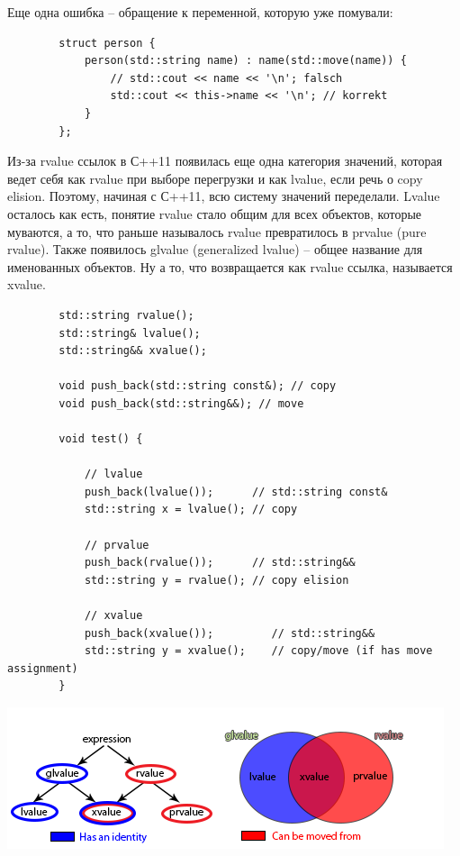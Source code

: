 \documentclass[12pt, a4paper]{article}
\begin{document}
	Еще одна ошибка -- обращение к переменной, которую уже помували:
	\begin{verbatim}
		struct person {
			person(std::string name) : name(std::move(name)) {
				// std::cout << name << '\n'; falsch
				std::cout << this->name << '\n'; // korrekt
			}
		};
	\end{verbatim}
	Из-за rvalue ссылок в С++11 появилась еще одна категория значений, которая ведет себя как rvalue при выборе перегрузки и как lvalue, если речь о copy elision. Поэтому, начиная с С++11, всю систему значений переделали. Lvalue осталось как есть, понятие rvalue стало общим для всех объектов, которые муваются, а то, что раньше называлось rvalue превратилось в prvalue (pure rvalue). Также появилось glvalue (generalized lvalue) -- общее название для именованных объектов. Ну а то, что возвращается как rvalue ссылка, называется xvalue.
	\begin{verbatim}
		std::string rvalue();
		std::string& lvalue();
		std::string&& xvalue();
		
		void push_back(std::string const&); // copy
		void push_back(std::string&&); // move
		
		void test() {
			
			// lvalue
			push_back(lvalue());      // std::string const&
			std::string x = lvalue(); // copy
			
			// prvalue 
			push_back(rvalue());      // std::string&&
			std::string y = rvalue(); // copy elision
			
			// xvalue
			push_back(xvalue());         // std::string&&
			std::string y = xvalue();    // copy/move (if has move assignment)
		}
	\end{verbatim}
	\includegraphics[scale=0.9]{value_categories.png}\\
\end{document}

